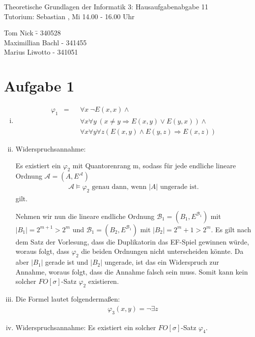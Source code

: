 \documentclass[a4paper,10pt]{article}
\begin{document}
\begin{center}
\Large{Theoretische Grundlagen der Informatik 3: Hausaufgabenabgabe 11} \\
\large{Tutorium: Sebastian , Mi 14.00 - 16.00 Uhr}
\end{center}
\begin{tabbing}
Tom Nick \hspace{2cm}\= - 340528\\
Maximillian Bachl \> - 341455 \\
Marius Liwotto\> -  341051
\end{tabbing}
\section*{Aufgabe 1}
	\begin{enumerate}[(i)]
		\item 
			\begin{align*}
				\varphi_1 &= &&\forall x~ \neg E(x,x) \wedge \\
				&&&\forall x \forall y~ 
				(x \neq y \Rightarrow E(x,y) \vee E(y,x)) \wedge  \\
				&&&\forall x \forall y \forall z (E(x,y) \wedge E(y,z) \Rightarrow E(x,z))
			\end{align*}
			
		\item
			Widerspruchsannahme:
			
			Es existiert ein $\varphi_2$ mit Quantorenrang m, sodass für jede endliche lineare Ordnung $\mathcal{A} = (A,E^{\mathcal{A}})$ 
			\begin{align*}
				\mathcal{A} \vDash \varphi_2 \text{ genau dann, wenn $|A|$ ungerade ist.}
			\end{align*}
			gilt.
			
			Nehmen wir nun die lineare endliche Ordnung $\mathcal{B}_1 = (B_1,E^{\mathcal{B}_1})$ mit $|B_1| = 2^{m+1} > 2^m$ und $\mathcal{B}_1 			= (B_2,E^{\mathcal{B}_1})$ mit $|B_2| = 2^m + 1 > 2^m$. Es gilt nach dem Satz der Vorlesung, dass die Duplikatorin das EF-Spiel 					gewinnen würde, woraus folgt, dass $\varphi_2$ die beiden Ordnungen nicht unterscheiden könnte. Da aber $|B_1|$ gerade ist und $|					B_2|$ ungerade, ist das ein Widerspruch zur Annahme, woraus folgt, dass die Annahme falsch sein muss. Somit kann 									kein solcher $FO[\sigma]$-Satz $\varphi_2$ existieren. 
		\item
Die Formel lautet folgendermaßen:
\begin{align*}
\varphi_3(x,y) = \lnot \exists z~ 
\end{align*}
		\item
			Widerspruchsannahme: Es existiert ein solcher $FO[\sigma]$-Satz $\varphi_4$. \\
			

\end{enumerate}
\end{document}
